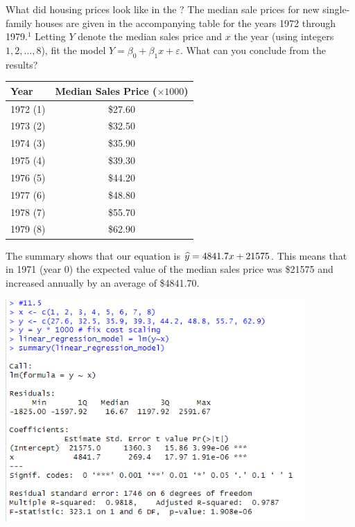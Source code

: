 What did housing prices look like in the ? The median sale prices for new single-family houses are given in the accompanying table for the years 1972 through 1979.${}^1$ Letting $Y$ denote the median sales price and $x$ the year (using integers $1,2, \ldots, 8$), fit the model $Y = \beta_0 + \beta_1 x + \varepsilon$. What can you conclude from the results?

  \begin{center}
    \begin{tabular}{lc}
         \hline
         Year & Median Sales Price ($\times 1000$)\\
         \hline
         1972 (1) & \$27.60 \\
         1973 (2) & \$32.50 \\
         1974 (3) & \$35.90 \\
         1975 (4) & \$39.30 \\
         1976 (5) & \$44.20 \\
         1977 (6) & \$48.80 \\
         1978 (7) & \$55.70 \\
         1979 (8) & \$62.90 \\
         \hline
    \end{tabular}
\end{center}

\soln* The summary shows that our equation is $\widehat{y} = 4841.7x + 21575$. This means that in 1971 (year 0) the expected value of the median sales price was \$21575 and increased annually by an average of \$4841.70. 

\includegraphics*[width=4.5in]{img/11_5.PNG}